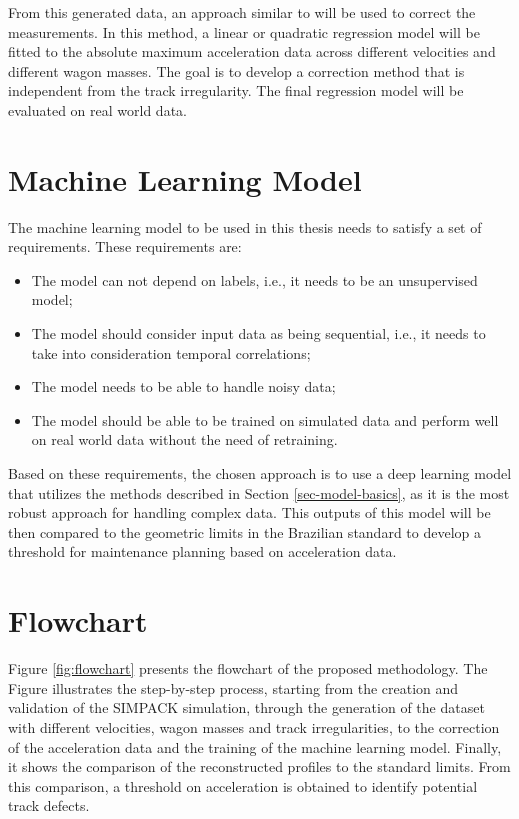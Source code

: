 From this generated data, an approach similar to \cite{Balouchi02092021} will be used to correct the measurements. In this method, a linear or quadratic regression model will be fitted to the absolute maximum acceleration data across different velocities and different wagon masses. The goal is to develop a correction method that is independent from the track irregularity. The final regression model will be evaluated on real world data.

\section{Machine Learning Model} \label{sec-ml-model}

The machine learning model to be used in this thesis needs to satisfy a set of requirements. These requirements are:
\begin{itemize}
    \item The model can not depend on labels, i.e., it needs to be an unsupervised model;
    \item The model should consider input data as being sequential, i.e., it needs to take into consideration temporal correlations;
    \item The model needs to be able to handle noisy data;
    \item The model should be able to be trained on simulated data and perform well on real world data without the need of retraining.
\end{itemize}

Based on these requirements, the chosen approach is to use a deep learning model that utilizes the methods described in Section \ref{sec-model-basics}, as it is the most robust approach for handling complex data. This outputs of this model will be then compared to the geometric limits in the Brazilian standard to develop a threshold for maintenance planning based on acceleration data.

\section{Flowchart} \label{sec-flowchart}

Figure \ref{fig:flowchart} presents the flowchart of the proposed methodology. The Figure illustrates the step-by-step process, starting from the creation and validation of the SIMPACK simulation, through the generation of the dataset with different velocities, wagon masses and track irregularities, to the correction of the acceleration data and the training of the machine learning model. Finally, it shows the comparison of the reconstructed profiles to the standard limits. From this comparison, a threshold on acceleration is obtained to identify potential track defects.

